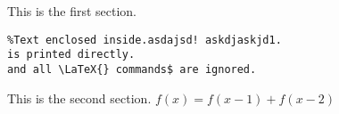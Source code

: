 This is the first section.


\begin{verbatim}
%Text enclosed inside.asdajsd! askdjaskjd1.
is printed directly. 
and all \LaTeX{} commands$ are ignored.
\end{verbatim}

This is the second section.
$f(x)=f(x-1)+f(x-2)$
